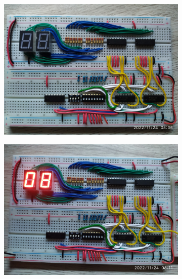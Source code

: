 \documentclass[12pt, oneside]{article}
\begin{document}
\begin{figure}[h!]
    \centering

    \begin{subfigure}{0.45\textwidth}
        \centering
        \includegraphics[width=\linewidth]{figs/IMG_20221124_080652.jpg}
    \end{subfigure}
    \begin{subfigure}{0.45\textwidth}
        \centering
        \includegraphics[width=\linewidth]{figs/IMG_20221124_081134.jpg}
    \end{subfigure}
    \begin{subfigure}{0.45\textwidth}
        \centering

\end{subfigure}
\end{figure}
\end{document}
